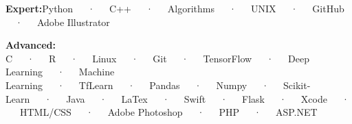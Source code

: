 \begin{cvletter}
\medskip
\begin{cvitems}
\item{\textbf{Expert:}\space\space Python~~~·~~~C++~~~·~~~Algorithms~~~·~~~UNIX~~~·~~~GitHub~~~·~~~Adobe Illustrator}
\item{\textbf{Advanced:}\space\space
C~~~·~~~R~~~·~~~Linux~~~·~~~Git~~~·~~~TensorFlow~~~·~~~Deep Learning~~~·~~~Machine Learning~~~·~~~TfLearn~~~·~~~Pandas~~~·~~~Numpy~~~·~~~Scikit-Learn~~~·~~~Java~~~·~~~LaTex~~~·~~~Swift~~~·~~~Flask~~~·~~~Xcode~~~·~~~HTML/CSS~~~·~~~Adobe Photoshop~~~·~~~PHP~~~·~~~ASP.NET
}
\end{cvitems}
\end{cvletter}
